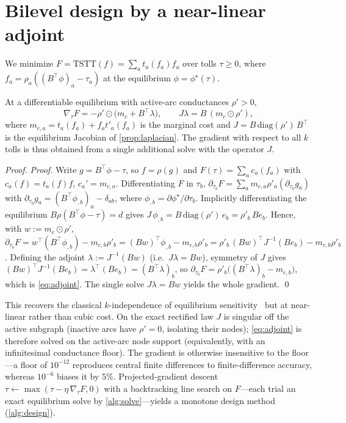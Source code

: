 \documentclass[ijoc]{informs3}
\begin{document}
\section{Bilevel design by a near-linear adjoint}\label{sec:design}
We minimize $F=\mathrm{TSTT}(f)=\sum_a t_a(f_a)f_a$ over tolls $\tau\ge0$, where $f_a=\rho_a((B^\top\phi)_a-\tau_a)$
at the equilibrium $\phi=\phi^\star(\tau)$.

\begin{proposition}\label{prop:adjoint}
At a differentiable equilibrium with active-arc conductances $\rho'>0$,
\begin{equation}\label{eq:adjoint}
\nabla_\tau F=-\rho'\odot\big(m_c+B^\top\lambda\big),\qquad J\lambda=B\,(m_c\odot\rho'),
\end{equation}
where $m_{c,a}=t_a(f_a)+f_a t'_a(f_a)$ is the marginal cost and $J=B\,\mathrm{diag}(\rho')\,B^\top$ is the
equilibrium Jacobian of \cref{prop:laplacian}. The gradient with respect to all $k$ tolls is thus obtained from a
single additional solve with the operator $J$.
\end{proposition}
\begin{proof}{\it Proof.}
Write $g=B^\top\phi-\tau$, so $f=\rho(g)$ and $F(\tau)=\sum_a c_a(f_a)$ with $c_a(f)=t_a(f)f$, $c_a'=m_{c,a}$.
Differentiating $F$ in $\tau_b$, $\partial_{\tau_b}F=\sum_a m_{c,a}\rho'_a(\partial_{\tau_b}g_a)$ with
$\partial_{\tau_b}g_a=(B^\top\phi_{,b})_a-\delta_{ab}$, where $\phi_{,b}=\partial\phi^\star/\partial\tau_b$.
Implicitly differentiating the equilibrium $B\rho(B^\top\phi-\tau)=d$ gives
$J\,\phi_{,b}=B\,\mathrm{diag}(\rho')\,e_b=\rho'_b\,B e_b$. Hence, with $w:=m_c\odot\rho'$,
$\partial_{\tau_b}F=w^\top(B^\top\phi_{,b})-m_{c,b}\rho'_b=(Bw)^\top\phi_{,b}-m_{c,b}\rho'_b
=\rho'_b\,(Bw)^\top J^{-1}(Be_b)-m_{c,b}\rho'_b$. Defining the adjoint $\lambda:=J^{-1}(Bw)$ (i.e.\ $J\lambda=Bw$),
symmetry of $J$ gives $(Bw)^\top J^{-1}(Be_b)=\lambda^\top(Be_b)=(B^\top\lambda)_b$, so
$\partial_{\tau_b}F=\rho'_b\big((B^\top\lambda)_b-m_{c,b}\big)$, which is \cref{eq:adjoint}. The single solve
$J\lambda=Bw$ yields the whole gradient. \qed
\end{proof}
This recovers the classical $k$-independence of equilibrium sensitivity~\citep{tobinfriesz1988,jp2007} but at
near-linear rather than cubic cost. On the exact rectified law $J$ is singular off the active subgraph
(inactive arcs have $\rho'=0$, isolating their nodes); \cref{eq:adjoint} is therefore solved on the active-arc
node support (equivalently, with an infinitesimal conductance floor). The gradient is otherwise insensitive to
the floor---a floor of $10^{-12}$ reproduces central finite differences to finite-difference accuracy, whereas
$10^{-6}$ biases it by $5\%$. Projected-gradient descent
$\tau\gets\max(\tau-\eta\,\nabla_\tau F,0)$ with a backtracking line search on $F$---each trial an exact
equilibrium solve by \cref{alg:solve}---yields a monotone design method (\cref{alg:design}).
\end{document}
